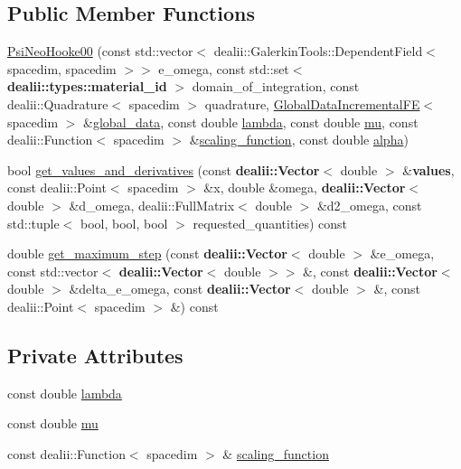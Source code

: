\subsection*{Public Member Functions}
\begin{DoxyCompactItemize}
\item 
\hyperlink{classincremental_f_e_1_1_psi_neo_hooke00_a07037cba86a5eccb0df8ff92fd3bf746}{Psi\+Neo\+Hooke00} (const std\+::vector$<$ dealii\+::\+Galerkin\+Tools\+::\+Dependent\+Field$<$ spacedim, spacedim $>$$>$ e\+\_\+omega, const std\+::set$<$ {\bf dealii\+::types\+::material\+\_\+id} $>$ domain\+\_\+of\+\_\+integration, const dealii\+::\+Quadrature$<$ spacedim $>$ quadrature, \hyperlink{classincremental_f_e_1_1_global_data_incremental_f_e}{Global\+Data\+Incremental\+FE}$<$ spacedim $>$ \&\hyperlink{classincremental_f_e_1_1_psi_3_01spacedim_00_01spacedim_01_4_abf0a4804877fd7cc9bd1b90e52760ba9}{global\+\_\+data}, const double \hyperlink{classincremental_f_e_1_1_psi_neo_hooke00_a8d6349afc4a3053f86b33db165a9a158}{lambda}, const double \hyperlink{classincremental_f_e_1_1_psi_neo_hooke00_a73d67e211d564b621cfbd934ab1e2924}{mu}, const dealii\+::\+Function$<$ spacedim $>$ \&\hyperlink{classincremental_f_e_1_1_psi_neo_hooke00_afa1ee9fcb2f0f52c12c07845844e1ed0}{scaling\+\_\+function}, const double \hyperlink{classincremental_f_e_1_1_psi_3_01spacedim_00_01spacedim_01_4_af7b8227188dbdd6ada35b9445d96c79d}{alpha})
\item 
bool \hyperlink{classincremental_f_e_1_1_psi_neo_hooke00_adee7dc5b32adc72ea65cb9c6218da802}{get\+\_\+values\+\_\+and\+\_\+derivatives} (const {\bf dealii\+::\+Vector}$<$ double $>$ \&{\bf values}, const dealii\+::\+Point$<$ spacedim $>$ \&x, double \&omega, {\bf dealii\+::\+Vector}$<$ double $>$ \&d\+\_\+omega, dealii\+::\+Full\+Matrix$<$ double $>$ \&d2\+\_\+omega, const std\+::tuple$<$ bool, bool, bool $>$ requested\+\_\+quantities) const 
\item 
double \hyperlink{classincremental_f_e_1_1_psi_neo_hooke00_a366b53c63dcabcea76c2c84218600a1d}{get\+\_\+maximum\+\_\+step} (const {\bf dealii\+::\+Vector}$<$ double $>$ \&e\+\_\+omega, const std\+::vector$<$ {\bf dealii\+::\+Vector}$<$ double $>$$>$ \&, const {\bf dealii\+::\+Vector}$<$ double $>$ \&delta\+\_\+e\+\_\+omega, const {\bf dealii\+::\+Vector}$<$ double $>$ \&, const dealii\+::\+Point$<$ spacedim $>$ \&) const 
\end{DoxyCompactItemize}
\subsection*{Private Attributes}
\begin{DoxyCompactItemize}
\item 
const double \hyperlink{classincremental_f_e_1_1_psi_neo_hooke00_a8d6349afc4a3053f86b33db165a9a158}{lambda}
\item 
const double \hyperlink{classincremental_f_e_1_1_psi_neo_hooke00_a73d67e211d564b621cfbd934ab1e2924}{mu}
\item 
const dealii\+::\+Function$<$ spacedim $>$ \& \hyperlink{classincremental_f_e_1_1_psi_neo_hooke00_afa1ee9fcb2f0f52c12c07845844e1ed0}{scaling\+\_\+function}
\end{DoxyCompactItemize}


